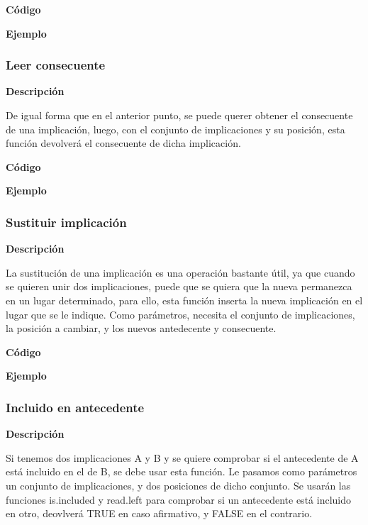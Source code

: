     \textbf{C\'odigo}


    \textbf{Ejemplo}


\subsubsection{Leer consecuente}

    \textbf{Descripci\'on}
    
    De igual forma que en el anterior punto, se puede querer obtener el consecuente de una implicaci\'on, luego, con el conjunto de 
    implicaciones y su posici\'on, esta funci\'on devolver\'a el consecuente de dicha implicaci\'on.

    \textbf{C\'odigo}


    \textbf{Ejemplo}


\subsubsection{Sustituir implicaci\'on}

    \textbf{Descripci\'on}

    La sustituci\'on de una implicaci\'on es una operaci\'on bastante \'util, ya que cuando se quieren unir dos implicaciones, puede que 
    se quiera que la nueva permanezca en un lugar determinado, para ello, esta funci\'on inserta la nueva implicaci\'on en el lugar que 
    se le indique. Como par\'ametros, necesita el conjunto de implicaciones, la posici\'on a cambiar, y los nuevos antedecente y consecuente.

    \textbf{C\'odigo}

    \textbf{Ejemplo}


\subsubsection{Incluido en antecedente}

    \textbf{Descripci\'on}

    Si tenemos dos implicaciones A y B y se quiere comprobar si el antecedente de A est\'a incluido en el de B, se debe usar 
    esta funci\'on. Le pasamos como par\'ametros un conjunto de implicaciones, y dos posiciones de dicho conjunto. Se usar\'an 
    las funciones is.included y read.left para comprobar si un antecedente est\'a incluido en otro, deovlver\'a TRUE en caso 
    afirmativo, y FALSE en el contrario.

